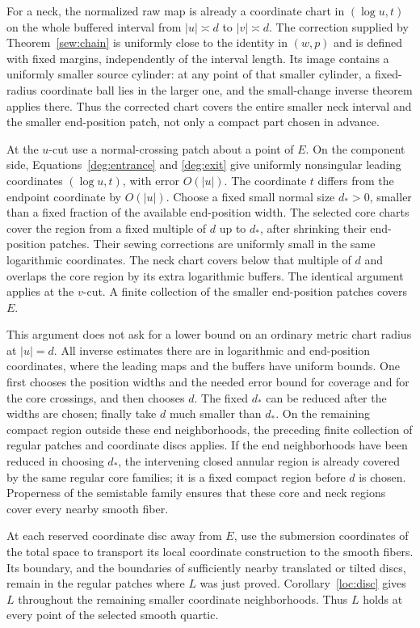 For a neck, the normalized raw map is already a coordinate chart
in $(\log u,t)$ on the whole buffered interval from $|u|\asymp d$
to $|v|\asymp d$.  The correction supplied by
Theorem~\ref{sew:chain} is uniformly close to the identity in
$(w,p)$ and is defined with fixed margins, independently of
the interval length.  Its image contains a uniformly smaller
source cylinder: at any point of that smaller cylinder, a
fixed-radius coordinate ball lies in the larger one, and the
small-change inverse theorem applies there.  Thus the corrected
chart covers the entire smaller neck interval and the smaller
end-position patch, not only a compact part chosen in advance.

At the $u$-cut use a normal-crossing patch about a point of $E$.
On the component side, Equations~\eqref{deg:entrance} and
\eqref{deg:exit} give uniformly nonsingular leading coordinates
$(\log u,t)$, with error $O(|u|)$.  The coordinate $t$ differs
from the endpoint coordinate by $O(|u|)$.  Choose a fixed small
normal size $d_*>0$, smaller than a fixed fraction of the
available end-position width.  The selected core charts cover
the region from a fixed multiple of $d$ up to $d_*$, after
shrinking their end-position patches.  Their sewing corrections
are uniformly small in the same logarithmic coordinates.
The neck chart covers below that multiple of $d$ and overlaps
the core region by its extra logarithmic buffers.  The identical
argument applies at the $v$-cut.  A finite collection of the
smaller end-position patches covers $E$.

This argument does not ask for a lower bound on an ordinary
metric chart radius at $|u|=d$.  All inverse estimates there
are in logarithmic and end-position coordinates, where the
leading maps and the buffers have uniform bounds.  One first
chooses the position widths and the needed error bound for
coverage and for the core crossings, and then chooses $d$.
The fixed $d_*$ can be reduced after the widths are chosen;
finally take $d$ much smaller than $d_*$.  On the remaining
compact region outside these end neighborhoods, the preceding
finite collection of regular patches and coordinate discs
applies.  If the end neighborhoods have been reduced in choosing
$d_*$, the intervening closed annular region is already covered
by the same regular core families; it is a fixed compact region
before $d$ is chosen.  Properness of the semistable family ensures that
these core and neck regions cover every nearby smooth fiber.

At each reserved coordinate disc away from $E$, use the
submersion coordinates of the total space to transport its
local coordinate construction to the smooth fibers.  Its
boundary, and the boundaries of sufficiently nearby translated
or tilted discs, remain in the regular patches where $L$ was
just proved.  Corollary~\ref{loc:disc} gives $L$ throughout the
remaining smaller coordinate neighborhoods.  Thus $L$ holds
at every point of the selected smooth quartic.

